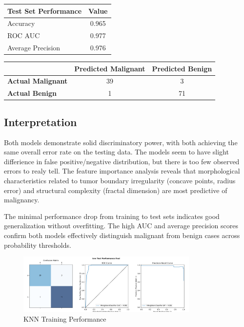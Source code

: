 \documentclass[letterpaper, 11pt]{amsart}
\begin{document}
\begin{table}[h]
\centering
\begin{tabular}{l|c|}
\textbf{Test Set Performance} & \textbf{Value} \\
\hline
Accuracy & 0.965 \\
ROC AUC & 0.977 \\
Average Precision & 0.976 \\
\hline
\end{tabular}
\end{table}

\begin{center}
\begin{tabular}{l|c|c|}
 & \textbf{Predicted Malignant} & \textbf{Predicted Benign} \\
\hline
\textbf{Actual Malignant} & 39 & 3 \\
\hline
\textbf{Actual Benign} & 1 & 71 \\
\hline
\end{tabular}
\end{center}

\subsection{Interpretation}
Both models demonstrate solid discriminatory power, with both achieving the same overall error rate on the testing data. The models seem to have slight differience in false positive/negative distribution, but there is too few observed errors to realy tell. The feature importance analysis reveals that morphological characteristics related to tumor boundary irregularity (concave points, radius error) and structural complexity (fractal dimension) are most predictive of malignancy.

The minimal performance drop from training to test sets indicates good generalization without overfitting. The high AUC and average precision scores confirm both models effectively distinguish malignant from benign cases across probability thresholds.

\begin{figure}[h]
\centering
\includegraphics[width=0.8\textwidth]{plots/knn_training_eval.png}
\caption{KNN Training Performance}
\end{figure}
\end{document}
